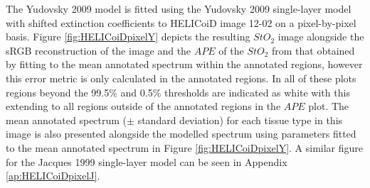 %

The Yudovsky 2009 model is fitted using the Yudovsky 2009 single-layer model with shifted extinction coefficients to HELICoiD image 12-02 on a pixel-by-pixel basis. Figure \ref{fig:HELICoiDpixelY} depicts the resulting $StO_2$ image alongside the sRGB reconstruction of the image and the $APE$ of the $StO_2$ from that obtained by fitting to the mean annotated spectrum within the annotated regions, however this error metric is only calculated in the annotated regions. In all of these plots regions beyond the 99.5\% and 0.5\% thresholds are indicated as white with this extending to all regions outside of the annotated regions in the $APE$ plot. The mean annotated spectrum ($\pm$ standard deviation) for each tissue type in this image is also presented alongside the modelled spectrum using parameters fitted to the mean annotated spectrum in Figure \ref{fig:HELICoiDpixelY}. A similar figure for the Jacques 1999 single-layer model can be seen in Appendix \ref{ap:HELICoiDpixelJ}.


